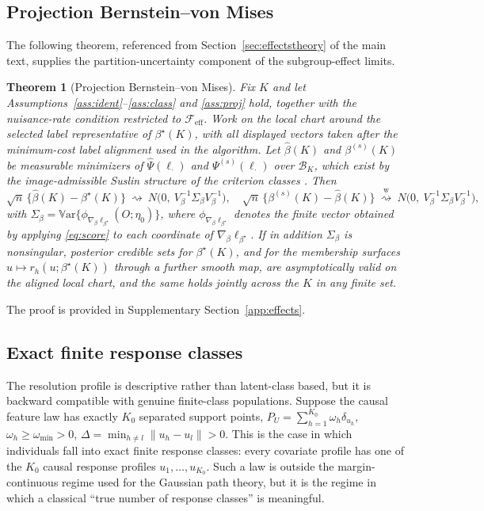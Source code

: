 \documentclass[11pt]{article}
\newtheorem{theorem}{Theorem}%
\newcommand{\Var}{\mathbb V\mathrm{ar}}
\newcommand{\dto}{\rightsquigarrow}
\newcommand{\dtow}{\overset{\mathrm w}{\rightsquigarrow}}
\newcommand{\calB}{\mathcal B}
\newcommand{\calF}{\mathcal F}
\newcommand{\hPsi}{\widehat\Psi}
\newcommand{\norm}[1]{\lVert #1\rVert}
\begin{document}
\subsection{Projection Bernstein--von Mises}\label{sec:app:projection_supp}

The following theorem, referenced from Section~\ref{sec:effectstheory} of the main text, supplies the partition-uncertainty component of the subgroup-effect limits.

\begin{theorem}[Projection Bernstein--von Mises]\label{thm:projection}
Fix $K$ and let Assumptions~\ref{ass:ident}--\ref{ass:class} and \ref{ass:proj} hold, together with the nuisance-rate condition restricted to $\calF_{\mathrm{eff}}$. Work on the local chart around the selected label representative of $\beta^\star(K)$, with all displayed vectors taken after the minimum-cost label alignment used in the algorithm. Let $\hat\beta(K)$ and $\beta^{(s)}(K)$ be measurable minimizers of $\hPsi(\ell_\cdot)$ and $\Psi^{(s)}(\ell_\cdot)$ over $\calB_K$, which exist by the image-admissible Suslin structure of the criterion classes \citep[Section~8.2]{kosorok2008}. Then
\begin{equation*}
\sqrt n\,\{\hat\beta(K)-\beta^\star(K)\}\ \dto\ N\bigl(0,\ V_\beta^{-1}\Sigma_\beta V_\beta^{-1}\bigr),
\quad
\sqrt n\,\{\beta^{(s)}(K)-\hat\beta(K)\}\ \dtow\ N\bigl(0,\ V_\beta^{-1}\Sigma_\beta V_\beta^{-1}\bigr),
\end{equation*}
with $\Sigma_\beta=\Var\{\phi_{\nabla_\beta\ell_{\beta^\star}}(O;\eta_0)\}$, where $\phi_{\nabla_\beta\ell_{\beta^\star}}$ denotes the finite vector obtained by applying \eqref{eq:score} to each coordinate of $\nabla_\beta\ell_{\beta^\star}$. If in addition $\Sigma_\beta$ is nonsingular, posterior credible sets for $\beta^\star(K)$, and for the membership surfaces $u\mapsto r_h(u;\beta^\star(K))$ through a further smooth map, are asymptotically valid on the aligned local chart, and the same holds jointly across the $K$ in any finite set.
\end{theorem}

The proof is provided in Supplementary Section~\ref{app:effects}.

\subsection{Exact finite response classes}\label{sec:exact_classes}

The resolution profile is descriptive rather than latent-class based, but it is backward compatible with genuine finite-class populations.  Suppose the causal feature law has exactly $K_0$ separated support points, $P_U=\sum_{h=1}^{K_0}\omega_h\delta_{u_h}$, $\omega_h\ge\omega_{\min}>0$, $\Delta=\min_{h\ne l}\norm{u_h-u_l}>0$.
This is the case in which individuals fall into exact finite response classes: every covariate profile has one of the $K_0$ causal response profiles $u_1,\ldots,u_{K_0}$.  Such a law is outside the margin-continuous regime used for the Gaussian path theory, but it is the regime in which a classical ``true number of response classes'' is meaningful.
\end{document}
